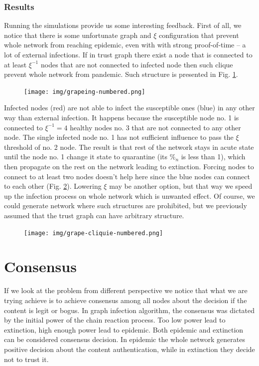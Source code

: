 \documentclass[nostrict]{szablonPG}
\begin{document}
\subsubsection{Results}
Running the simulations provide us some interesting feedback. First of all, we notice that there is some unfortunate graph and $\xi$ configuration that prevent whole network from reaching epidemic, even with with strong proof-of-time -- a lot of external infections. 
If in trust graph there exist a node that is connected to at least $\xi^{-1}$ nodes that are not connected to infected node then such clique prevent whole network from pandemic. Such structure is presented in Fig. \ref{fig:grapeproblem}.
\begin{figure}
    \texttt{[image: img/grapeing-numbered.png]}
    \centering
    \label{fig:grapeproblem}
\end{figure}
Infected nodes (red) are not able to infect the susceptible ones (blue) in any other way than external infection. It happens because the susceptible node no. 1 is connected to $\xi^{-1} = 4$ healthy nodes no. 3 that are not connected to any other node. The single infected node no. 1 has not sufficient influence to pass the $\xi$ threshold of no. 2 node. The result is that rest of the network stays in acute state until the node no. 1 change it state to quarantine (its $\%_n$ is less than 1), which then propagate on the rest on the network leading to extinction. Forcing nodes to connect to at least two nodes doesn't help here since the blue nodes can connect to each other (Fig. \ref{fig:grape-cliquie-numbered}). 
Lowering $\xi$ may be another option, but that way we speed up the infection process on whole network which is unwanted effect. Of course, we could generate network where such structures are prohibited, but we previously assumed that the trust graph can have arbitrary structure.
\begin{figure}
    \texttt{[image: img/grape-cliquie-numbered.png]}
    \centering
    \label{fig:grape-cliquie-numbered}
\end{figure}





\section{Consensus}
If we look at the problem from different perspective we notice that what we are trying achieve is to achieve consensus among all nodes about the decision if the content is legit or bogus. In graph infection algorithm, the consensus was dictated by the initial power of the chain reaction process. Too low power lead to extinction, high enough power lead to epidemic. Both epidemic and extinction can be considered consensus decision. In epidemic the whole network generates positive decision about the content authentication, while in extinction they decide not to trust it. 
\end{document}
